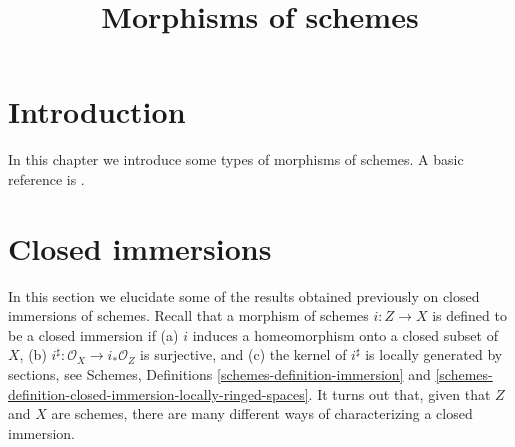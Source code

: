 

%


\title{Morphisms of schemes}


\maketitle

\label{section-phantom}

\tableofcontents

\section{Introduction}
\label{section-introduction}

\noindent
In this chapter we introduce some types of morphisms of schemes.
A basic reference is \cite{EGA}.




















\section{Closed immersions}
\label{section-closed-immersions}

\noindent
In this section we elucidate some of the results obtained previously on closed
immersions of schemes. Recall that a morphism of schemes $i : Z \to X$
is defined to be a closed immersion if (a) $i$ induces a homeomorphism onto
a closed subset of $X$, (b) $i^\sharp : \mathcal{O}_X \to i_*\mathcal{O}_Z$
is surjective, and (c) the kernel of $i^\sharp$ is locally generated by
sections, see Schemes, Definitions \ref{schemes-definition-immersion}
and \ref{schemes-definition-closed-immersion-locally-ringed-spaces}. It turns
out that, given that $Z$ and $X$ are schemes, there are many different
ways of characterizing a closed immersion.

